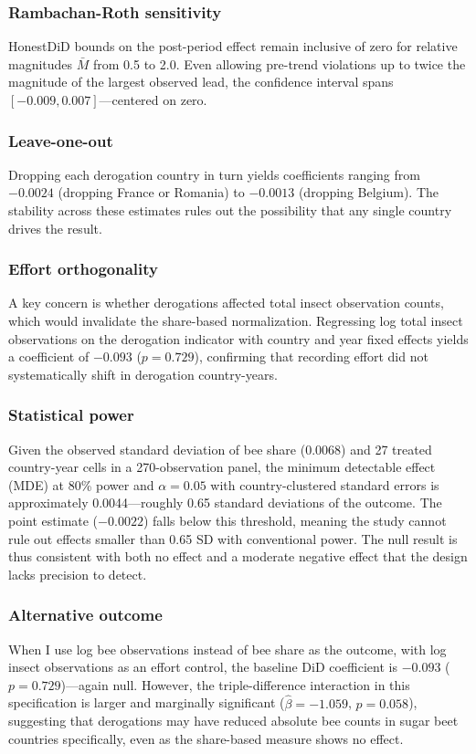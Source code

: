 \documentclass[12pt]{article}
\begin{document}
\subsubsection*{Rambachan-Roth sensitivity} HonestDiD bounds on the post-period effect remain inclusive of zero for relative magnitudes $\bar{M}$ from 0.5 to 2.0. Even allowing pre-trend violations up to twice the magnitude of the largest observed lead, the confidence interval spans $[-0.009, 0.007]$---centered on zero.

\subsubsection*{Leave-one-out} Dropping each derogation country in turn yields coefficients ranging from $-0.0024$ (dropping France or Romania) to $-0.0013$ (dropping Belgium). The stability across these estimates rules out the possibility that any single country drives the result.

\subsubsection*{Effort orthogonality} A key concern is whether derogations affected total insect observation counts, which would invalidate the share-based normalization. Regressing log total insect observations on the derogation indicator with country and year fixed effects yields a coefficient of $-0.093$ ($p = 0.729$), confirming that recording effort did not systematically shift in derogation country-years.

\subsubsection*{Statistical power} Given the observed standard deviation of bee share (0.0068) and 27 treated country-year cells in a 270-observation panel, the minimum detectable effect (MDE) at 80\% power and $\alpha = 0.05$ with country-clustered standard errors is approximately 0.0044---roughly 0.65 standard deviations of the outcome. The point estimate ($-0.0022$) falls below this threshold, meaning the study cannot rule out effects smaller than 0.65 SD with conventional power. The null result is thus consistent with both no effect and a moderate negative effect that the design lacks precision to detect.

\subsubsection*{Alternative outcome} When I use log bee observations instead of bee share as the outcome, with log insect observations as an effort control, the baseline DiD coefficient is $-0.093$ ($p = 0.729$)---again null. However, the triple-difference interaction in this specification is larger and marginally significant ($\hat{\beta} = -1.059$, $p = 0.058$), suggesting that derogations may have reduced absolute bee counts in sugar beet countries specifically, even as the share-based measure shows no effect.
\end{document}
